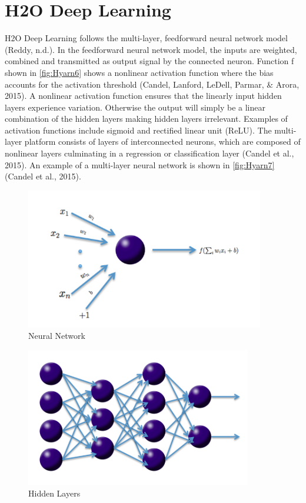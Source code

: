 \documentclass[12pt,twoside]{amherstthesis}
\begin{document}
  \section{H2O Deep Learning}\label{h2o-deep-learning}
  
  H2O Deep Learning follows the multi-layer, feedforward neural network
  model (Reddy, n.d.). In the feedforward neural network model, the inputs
  are weighted, combined and transmitted as output signal by the connected
  neuron. Function f shown in \autoref{fig:Hyarn6} shows a nonlinear
  activation function where the bias accounts for the activation threshold
  (Candel, Lanford, LeDell, Parmar, \& Arora, 2015). A nonlinear
  activation function ensures that the linearly input hidden layers
  experience variation. Otherwise the output will simply be a linear
  combination of the hidden layers making hidden layers irrelevant.
  Examples of activation functions include sigmoid and rectified linear
  unit (ReLU). The multi-layer platform consists of layers of
  interconnected neurons, which are composed of nonlinear layers
  culminating in a regression or classification layer (Candel et al.,
  2015). An example of a multi-layer neural network is shown in
  \autoref{fig:Hyarn7} (Candel et al., 2015).
  
  \begin{figure}[htbp]
  \centering
  \includegraphics[scale = 0.6,angle = 0]{figure/neuralNet.png}
  \caption[Neural Network]{\normalsize{Neural Network}}
  \label{fig:Hyarn6}
  \end{figure}
  
  \begin{figure}[htbp]
  \centering
  \includegraphics[scale = 0.5,angle = 0]{figure/neuralHid.png}
  \caption[Hidden Layers]{\normalsize{Hidden Layers}}
  \label{fig:Hyarn7}
  \end{figure}
  
\end{document}

